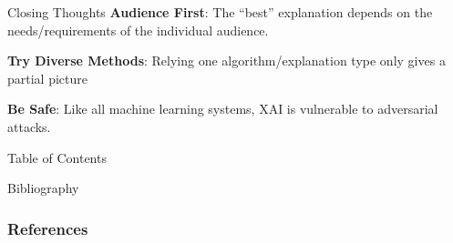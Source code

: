 \documentclass[11pt,dvipsnames,usenames,aspectratio=169]{beamer}  %
\begin{document}
\begin{frame}{Closing Thoughts}{}
  \textbf{Audience First}: The ``best'' explanation depends on the needs/requirements of the individual audience.

  \vspace{18pt}
  \textbf{Try Diverse Methods}: Relying one algorithm/explanation type only gives a partial picture

  \vspace{18pt}
  \textbf{Be Safe}: Like all machine learning systems, XAI is vulnerable to adversarial attacks.
\end{frame}

\begin{frame}[noframenumbering]{Table of Contents}
  \tableofcontents
\end{frame}

\begin{frame}{Bibliography}{}
  {\tiny
    \frametitle{References}
    
    
  }
\end{frame}
\end{document}
